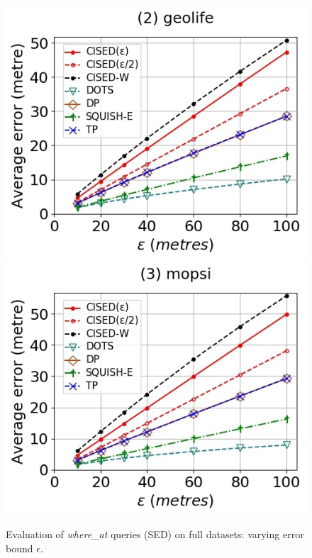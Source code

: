 {\begin{figure}[tb!]
	\includegraphics[scale = 0.250]{Figures/Exp-where-SED-error-epsilon-geolife.jpg}\hspace{0.5ex}
	\includegraphics[scale = 0.250]{Figures/Exp-where-SED-error-epsilon-mopsi.jpg}
	\vspace{-2ex}
	\caption{\small Evaluation of {\emph{where\_at}} queries (SED) on full datasets: varying error bound $\epsilon$.}
	\label{fig:query-sed-epsilon}
	\vspace{-1.0ex}
\end{figure}
\begin{figure}[tb!]

\end{figure}}
